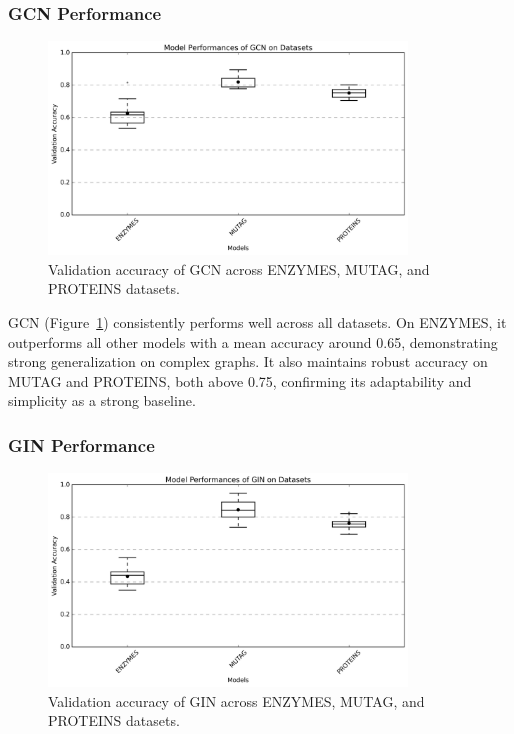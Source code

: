 \documentclass[11pt,a4paper]{article}
\begin{document}
	\subsubsection*{GCN Performance}
	
	\begin{figure}[h]
		\centering
		\includegraphics[width=0.85\textwidth]{boxplot_GCN.png}
		\caption{Validation accuracy of GCN across ENZYMES, MUTAG, and PROTEINS datasets.}
		\label{fig:gcn}
	\end{figure}
	
	GCN (Figure~\ref{fig:gcn}) consistently performs well across all datasets. On ENZYMES, it outperforms all other models with a mean accuracy around 0.65, demonstrating strong generalization on complex graphs. It also maintains robust accuracy on MUTAG and PROTEINS, both above 0.75, confirming its adaptability and simplicity as a strong baseline.
	
	\subsubsection*{GIN Performance}
	
	\begin{figure}[h]
		\centering
		\includegraphics[width=0.85\textwidth]{boxplot_GIN.png}
		\caption{Validation accuracy of GIN across ENZYMES, MUTAG, and PROTEINS datasets.}
		\label{fig:gin}
	\end{figure}
	
\end{document}
